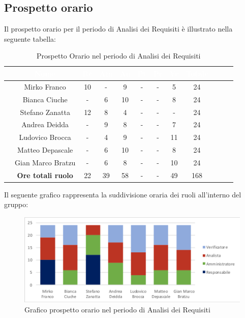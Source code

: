 \subsection{Prospetto orario}
Il prospetto orario per il periodo di Analisi dei Requisiti è illustrato nella seguente tabella:

\begin{table}[ht]
	\begin{center}
		\begin{tabular}{cccccccccccc}
			\rowcolor{coolblack}
			\hline 
			& \textcolor{white}{Nome} & \textcolor{white}{Re} & \textcolor{white}{Am} & \textcolor{white}{An} & \textcolor{white}{Pt} &\textcolor{white}{Pr} & \textcolor{white}{Ve} & \textcolor{white}{Totale} \\
			\hline
			
			&Mirko Franco          & 10 & - & 9 & - & - & 5 &24  \\
			&Bianca Ciuche        & -  & 6 & 10 & - & - & 8 & 24 \\
			&Stefano Zanatta     & 12& 8 & 4 & - & - & - & 24 \\
			&Andrea Deidda       &  -& 9 & 8 & - & - & 7 & 24 \\
			&Ludovico Brocca    & -& 4 & 9 & - & - & 11 & 24 \\
			&Matteo Depascale  & -& 6& 10 & - & - & 8 & 24 \\
			&Gian Marco Bratzu & -& 6 & 8 & - & - & 10 & 24 \\
			\hline
			&\textbf{Ore totali ruolo} & 22 & 39 & 58 & - & - & 49 & 168 \\
		\end{tabular}
		\caption{Prospetto Orario nel periodo di Analisi dei Requisiti}
	\end{center}
\end{table}

Il seguente grafico rappresenta la suddivisione oraria dei ruoli all'interno del gruppo:
\begin{figure}[!ht]
	\begin{center}
		\includegraphics{images/grafoProspettoOrario.png}
		\caption{Grafico prospetto orario nel periodo di Analisi dei Requisiti }
	\end{center}
\end{figure}

